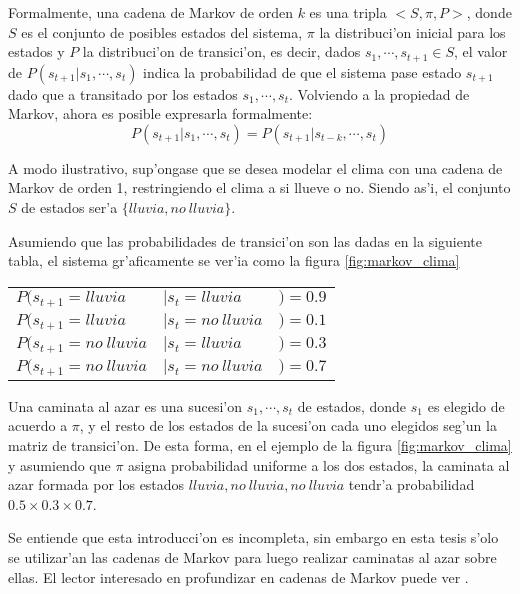 Formalmente, una cadena de Markov de orden $k$ es una tripla $<S,\pi, P>$, donde $S$ es el conjunto de posibles estados del sistema, $\pi$ la distribuci'on
inicial para los estados y $P$ la 
distribuci'on de transici'on, es decir, dados $s_1, \cdots, s_{t+1} \in S$, el valor de $P(s_{t+1} | s_1, \cdots, s_t)$ indica la probabilidad
de que el sistema pase estado $s_{t+1}$ dado que a transitado por los estados $s_1, \cdots, s_t$. 
Volviendo a la propiedad de Markov, ahora es posible expresarla formalmente: $$P(s_{t+1}|s_1,\cdots,s_t) = P(s_{t+1} | s_{t-k}, \cdots, s_t)$$

A modo ilustrativo, sup'ongase que se desea modelar el clima con una cadena de Markov de orden 1, restringiendo el clima a si llueve o no. Siendo as'i, el conjunto 
$S$ de estados ser'a $\{lluvia, no\ lluvia\}$. 

Asumiendo que las probabilidades de transici'on son las dadas en la siguiente tabla, el sistema gr'aficamente se ver'ia como la figura \ref{fig:markov_clima}

\begin{center}
\label{tabla_markov}
\begin{tabular}{l l l}
$P(s_{t+1} = lluvia $ & $| s_t = lluvia $ & $)=0.9$ \\
$P(s_{t+1} = lluvia $ & $|s_t= no\ lluvia $& $)=0.1$\\
$P(s_{t+1} = no\ lluvia $ & $| s_t= lluvia  $ & $)=0.3$ \\
$P(s_{t+1} = no\ lluvia $ & $|s_t= no\ lluvia $ & $)=0.7$\\
\end{tabular}
\end{center}

\begin{imagen}
    \width{5cm}
\end{imagen}

Una caminata al azar es una sucesi'on $s_1, \cdots, s_t$ de estados, donde $s_1$ es elegido de acuerdo a $\pi$, 
y el resto de los estados de la sucesi'on cada uno elegidos seg'un la matriz de transici'on. De esta forma, en el ejemplo de la figura \ref{fig:markov_clima} y asumiendo 
que $\pi$ asigna probabilidad uniforme a los dos estados, la caminata al azar formada por los estados $lluvia, no\ lluvia, no\ lluvia$ tendr'a probabilidad $0.5\times0.3\times0.7$. 

Se entiende que esta introducci'on es incompleta, sin embargo en esta tesis s'olo se utilizar'an las cadenas de Markov para luego realizar 
caminatas al azar sobre ellas. El lector interesado en profundizar en cadenas de Markov puede ver \cite{Rabiner90}.


